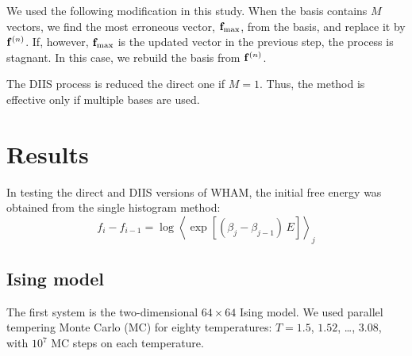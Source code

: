\documentclass[reprint,superscriptaddress]{revtex4-1}
\begin{document}
We used the following modification
in this study.
%
When the basis contains $M$ vectors,
we find the most erroneous vector,
$\mathbf{f}_\mathrm{max}$, from the basis,
and replace it by $\mathbf{f}^{(n)}$.
%
If, however,
$\mathbf{f}_\mathrm{max}$
is the updated vector in the previous step,
the process is stagnant.
%
In this case,
we rebuild the basis from $\mathbf{f}^{(n)}$.



%
%
%



The DIIS process is reduced the direct one
if $M = 1$.
%
Thus,
the method is effective
only if multiple bases are used.





\section{Results}





In testing the direct and DIIS versions of WHAM,
the initial free energy was obtained from
the single histogram method:
%
\begin{equation*}
f_i - f_{i-1}
=
\log
\left\langle
  \exp\left[
    (\beta_j - \beta_{j-1}) \, E
  \right]
\right\rangle_j
\end{equation*}
%



\subsection{Ising model}



The first system is
the two-dimensional $64\times64$ Ising model.
%
We used parallel tempering\cite{
  swendsen1986, *geyer1991, *hukushima1996, *hansmann1997,
  *earl2005}
Monte Carlo (MC)
for
eighty temperatures: $T = 1.5$, $1.52$, \dots, $3.08$,
with $10^7$ MC steps on each temperature.
\end{document}
